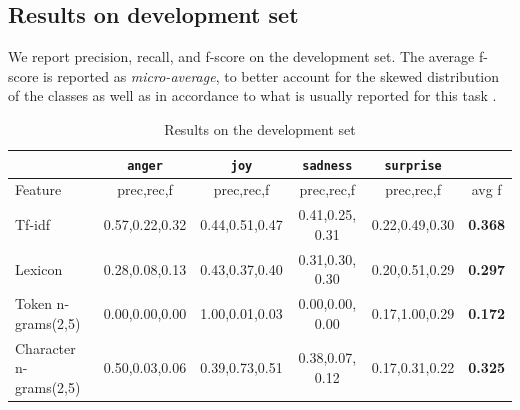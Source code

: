 \documentclass[11pt]{article}
\begin{document}
\subsection{Results on development set}

We report precision, recall, and f-score on the development set. The average f-score is reported as \textit{micro-average}, to better account for the skewed distribution of the classes as well as in accordance to what is usually reported for this task \cite{mohammad2015using}.

\begin{table}[!htbp]
\caption{Results on the development set\label{test_results_svm}}
\centering
\begin{tabular}{|l|c|c|c|c|c|}
\hline
    & \texttt{anger} & \texttt{joy} & \texttt{sadness} & \texttt{surprise} &  \\ 
    \hline
          Feature         & prec,rec,f & prec,rec,f & prec,rec,f & prec,rec,f & avg f \\

\hline
  \footnotesize{Tf-idf} &
  \footnotesize{0.57,0.22,0.32}  & 
  \footnotesize{0.44,0.51,0.47} & 
  \footnotesize{0.41,0.25, 0.31} & 
  \footnotesize{0.22,0.49,0.30} & 
  \footnotesize{\textbf{0.368}}  \\ 


\hline
  \footnotesize{Lexicon} &
  \footnotesize{0.28,0.08,0.13}  & 
  \footnotesize{0.43,0.37,0.40} & 
  \footnotesize{0.31,0.30, 0.30} & 
  \footnotesize{0.20,0.51,0.29} & 
   \footnotesize{\textbf{0.297}}  \\ 


\hline
  \footnotesize{Token n-grams(2,5)} &
  \footnotesize{0.00,0.00,0.00}  & 
  \footnotesize{1.00,0.01,0.03} & 
  \footnotesize{0.00,0.00, 0.00} & 
  \footnotesize{0.17,1.00,0.29} & 
  \footnotesize{\textbf{0.172}}  \\ 


\hline
  \footnotesize{Character n-grams(2,5)} &
  \footnotesize{0.50,0.03,0.06}  & 
  \footnotesize{0.39,0.73,0.51} & 
  \footnotesize{0.38,0.07, 0.12} & 
  \footnotesize{0.17,0.31,0.22} & 
  \footnotesize{\textbf{0.325}}  \\ 



\end{tabular}
\end{table}
\end{document}
